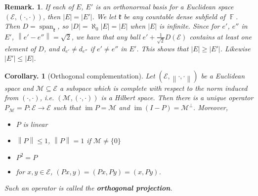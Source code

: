 \documentclass[11pt, a4paper]{memoir}
\DeclareMathOperator{\F}{{\mathbb{F}}}
\newcommand{\norm}[1]{\ensuremath{\left\lVert#1\right\rVert}}
\theoremstyle{change}
\newtheorem{corollary}[theorem]{Corollary.}
\theoremstyle{plain}
\theoremstyle{nonumberplain}
\newtheorem{remark}{Remark.}
\DeclareMathOperator{\im}{im}
\DeclareMathOperator{\spn}{span}
\newcommand{\inr}[1]{\ensuremath{\left(#1\right)}}
\numberwithin{equation}{section}
\begin{document}
\begin{remark}
    If each of $E$, $E'$ is an orthonormal basis for a Euclidean space $(\mathcal{E},\inr{\cdot,\cdot})$, then $|E|=|E'|$.
    We let $\mathfrak{k}$ be any countable dense subfield of $\F$.
    Then $D=\spn_{\mathfrak{k}}$, so $|D|=\aleph_0|E|=|E|$ when $|E|$ is infinite.
    Since for $e'$, $e''$ in $E'$, $\norm{e'-e''}=\sqrt{2}$, we have that any ball $e'+\frac{1}{\sqrt{2}}D(\mathcal{E})$ contains at least one element of $D$, and $d_{e'}\neq d_{e''}$ if $e'\neq e''$ in $E'$.
    This shows that $|E|\geq|E'|$.
    Likewise $|E'|\leq|E|$.
\end{remark}
\begin{corollary}[Orthogonal complementation]
    Let $(\mathcal{E},\norm{\cdot,\cdot})$ be a Euclidean space and $\mathcal{M}\subseteq\mathcal{E}$ a subspace which is complete with respect to the norm induced from $\inr{\cdot,\cdot}$, i.e. $(\mathcal{M},\inr{\cdot,\cdot})$ is a Hilbert space.
    Then there is a unique operator $P_{\mathcal{M}}=P:\mathcal{E}\to\mathcal{E}$ such that $\im P=\mathcal{M}$ and $\im(I-P)=\mathcal{M}^\perp$.
    Moreover,
    \begin{itemize}[nl]
        \item $P$ is linear
        \item $\norm{P}\leq 1$, $\norm{P}=1$ if $\mathcal{M}\neq\{0\}$
        \item $P^2=P$
        \item for $x,y\in\mathcal{E}$, $\inr{Px,y}=\inr{Px,Py}=\inr{x,Py}$.
    \end{itemize}
    Such an operator is called the \textbf{orthogonal projection}.
\end{corollary}
\end{document}
